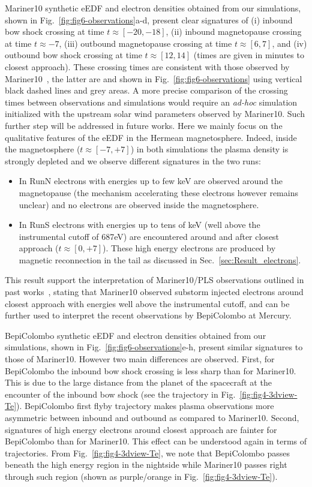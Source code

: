 \documentclass{aa}
\begin{document}
Mariner10 synthetic eEDF and electron densities obtained from our simulations, shown in Fig.~\ref{fig:fig6-observations}a-d, present clear signatures of (i) inbound bow shock crossing at time $t\approx[-20,-18]$, (ii) inbound magnetopause crossing at time $t\approx-7$, (iii) outbound magnetopause crossing at time $t\approx[6,7]$, and (iv) outbound bow shock crossing at time $t\approx[12,14]$ (times are given in minutes to closest approach).
These crossing times are consistent with those observed by Mariner10~\citep{Russell1988}, the latter are and shown in Fig.~\ref{fig:fig6-observations} using vertical black dashed lines and grey areas. A more precise comparison of the crossing times between observations and simulations would require an \textit{ad-hoc} simulation initialized with the upstream solar wind parameters observed by Mariner10. Such further step will be addressed in future works. Here we mainly focus on the qualitative features of the eEDF in the Hermean magnetosphere. Indeed, inside the magnetosphere ($t\approx[-7,+7]$) in both simulations the plasma density is strongly depleted and we observe different signatures in the two runs:
\begin{itemize}
    \item In RunN electrons with energies up to few keV are observed around the magnetopause (the mechanism accelerating these electrons however remains unclear) and no electrons are observed inside the magnetosphere.
    \item In RunS electrons with energies up to tens of keV (well above the instrumental cutoff of 687eV) are encountered around and after closest approach ($t\approx[0,+7]$). These high energy electrons are produced by magnetic reconnection in the tail as discussed in Sec.~\ref{sec:Result_electrons}.
\end{itemize}
This result support the interpretation of Mariner10/PLS observations outlined in past works~\citep{Ogilvie1974,Christon1987}, stating that Mariner10 observed substorm injected electrons around closest approach with energies well above the instrumental cutoff, and can be further used to interpret the recent observations by BepiColombo at Mercury.

BepiColombo synthetic eEDF and electron densities obtained from our simulations, shown in Fig.~\ref{fig:fig6-observations}e-h, present similar signatures to those of Mariner10. However two main differences are observed.
First, for BepiColombo the inbound bow shock crossing is less sharp than for Mariner10. This is due to the large distance from the planet of the spacecraft at the encounter of the inbound bow shock (see the trajectory in Fig.~\ref{fig:fig4-3dview-Te}). BepiColombo first flyby trajectory makes plasma observations more asymmetric between inbound and outbound as compared to Mariner10.
Second, signatures of high energy electrons around closest approach are fainter for BepiColombo than for Mariner10. This effect can be understood again in terms of trajectories. From Fig.~\ref{fig:fig4-3dview-Te}, we note that BepiColombo passes beneath the high energy region in the nightside while Mariner10 passes right through such region (shown as purple/orange in Fig.~\ref{fig:fig4-3dview-Te}).
\end{document}
